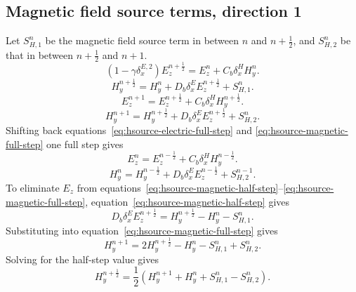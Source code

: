 \documentclass{article}
\numberwithin{figure}{section}
\begin{document}
\subsection{Magnetic field source terms, direction 1}
Let $S_{H,1}^n$ be the magnetic field source term in between $n$ and $n+\frac{1}{2}$, and $S_{H,2}^n$ be that in between $n+\frac{1}{2}$ and $n+1$.
\begin{equation}
    \left(1-\gamma\delta_x^{E,2}\right)E_z^{n+\frac{1}{2}}=E_z^n+C_b\delta_x^H H_y^n. \label{eq:hsource-implicit-electric-half-step}
\end{equation}
\begin{equation}
    H_y^{n+\frac{1}{2}}=H_y^n+D_b\delta_x^E E_z^{n+\frac{1}{2}}+S_{H,1}^n. \label{eq:hsource-magnetic-half-step}
\end{equation}
\begin{equation}
    E_z^{n+1}=E_z^{n+\frac{1}{2}}+C_b\delta_x^H H_y^{n+\frac{1}{2}}. \label{eq:hsource-electric-full-step}
\end{equation}
\begin{equation}
    H_y^{n+1}=H_y^{n+\frac{1}{2}}+D_b\delta_x^E E_z^{n+\frac{1}{2}}+S_{H,2}^n. \label{eq:hsource-magnetic-full-step}
\end{equation}
Shifting back equations~\eqref{eq:hsource-electric-full-step} and \eqref{eq:hsource-magnetic-full-step} one full step gives
\begin{equation}
    E_z^n=E_z^{n-\frac{1}{2}}+C_b\delta_x^H H_y^{n-\frac{1}{2}}. \label{eq:hsource-shifted-electric-step}
\end{equation}
\begin{equation}
    H_y^n=H_y^{n-\frac{1}{2}}+D_b\delta_x^E E_z^{n-\frac{1}{2}}+S_{H,2}^{n-1}. \label{eq:hsource-shifted-magnetic-step}
\end{equation}
To eliminate $E_z$ from equations~\eqref{eq:hsource-magnetic-half-step}--\eqref{eq:hsource-magnetic-full-step}, equation~\eqref{eq:hsource-magnetic-half-step} gives
\begin{equation}
    D_b\delta_x^E E_z^{n+\frac{1}{2}}=H_y^{n+\frac{1}{2}}-H_y^n-S_{H,1}^n. \label{eq:hsource-e-elimination-identity}
\end{equation}
Substituting into equation~\eqref{eq:hsource-magnetic-full-step} gives
\begin{equation}
    H_y^{n+1}=2H_y^{n+\frac{1}{2}}-H_y^n-S_{H,1}^n+S_{H,2}^n. \label{eq:hsource-h-after-e-substitution}
\end{equation}
Solving for the half-step value gives
\begin{equation}
    H_y^{n+\frac{1}{2}}=\frac{1}{2}\left(H_y^{n+1}+H_y^n+S_{H,1}^n-S_{H,2}^n\right). \label{eq:hsource-h-only-first-half}
\end{equation}
\end{document}
